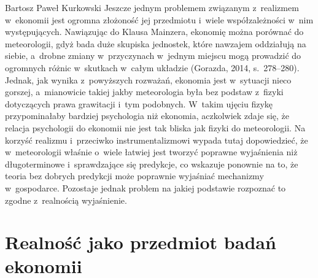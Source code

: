 \begin{artplenv}{Bartosz Paweł Kurkowski}
Jeszcze jednym problemem związanym z~realizmem w~ekonomii jest ogromna złożoność jej przedmiotu i~wiele współzależności
w~nim występujących. Nawiązując do Klausa Mainzera, ekonomię można porównać do meteorologii, gdyż bada duże skupiska
jednostek, które nawzajem oddziałują na siebie, a~drobne zmiany w~przyczynach w~jednym miejscu mogą prowadzić do
ogromnych różnic w~skutkach w~całym układzie \label{ref:RNDwT1Ozcud5S}(Gorazda, 2014, s.~278–280). Jednak, jak
wynika z~powyższych rozważań, ekonomia jest w~sytuacji nieco gorszej, a~mianowicie takiej jakby meteorologia była bez
podstaw z~fizyki dotyczących prawa grawitacji i~tym podobnych. W~takim ujęciu fizykę przypominałaby bardziej psychologia niż
ekonomia, aczkolwiek zdaje się, że relacja psychologii do ekonomii nie jest tak bliska jak fizyki do meteorologii. Na
korzyść realizmu i~przeciwko instrumentalizmowi wypada tutaj dopowiedzieć, że w~meteorologii właśnie o~wiele łatwiej
jest tworzyć poprawne wyjaśnienia niż długoterminowe i~sprawdzające się predykcje, co wskazuje ponownie na to, że
teoria bez dobrych predykcji może poprawnie wyjaśniać mechanizmy w~gospodarce. Pozostaje jednak problem na jakiej
podstawie rozpoznać to zgodne z~realnością wyjaśnienie.

\section{Realność jako przedmiot badań ekonomii}


\end{artplenv}

